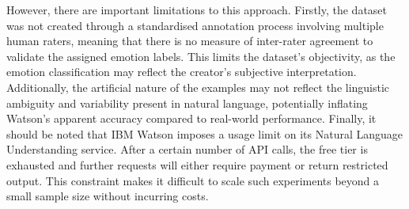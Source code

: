 However, there are important limitations to this approach. Firstly, the dataset was not created through a standardised annotation process involving multiple human raters, meaning that there is no measure of inter-rater agreement to validate the assigned emotion labels. This limits the dataset's objectivity, as the emotion classification may reflect the creator's subjective interpretation. Additionally, the artificial nature of the examples may not reflect the linguistic ambiguity and variability present in natural language, potentially inflating Watson's apparent accuracy compared to real-world performance. Finally, it should be noted that IBM Watson imposes a usage limit on its Natural Language Understanding service. After a certain number of API calls, the free tier is exhausted and further requests will either require payment or return restricted output. This constraint makes it difficult to scale such experiments beyond a small sample size without incurring costs.

